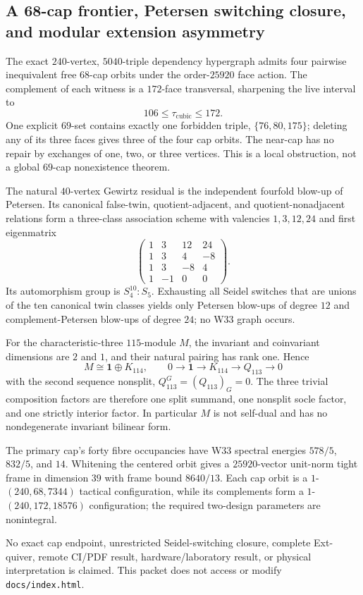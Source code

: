 \subsection{A 68-cap frontier, Petersen switching closure, and modular extension asymmetry}
\label{sec:bt3913-3928}

The exact $240$-vertex, $5040$-triple dependency hypergraph admits four pairwise inequivalent free $68$-cap orbits under the order-$25920$ face action.  The complement of each witness is a $172$-face transversal, sharpening the live interval to
\[
106\leq\tau_{\mathrm{cubic}}\leq172.
\]
One explicit $69$-set contains exactly one forbidden triple, $\{76,80,175\}$; deleting any of its three faces gives three of the four cap orbits.  The near-cap has no repair by exchanges of one, two, or three vertices.  This is a local obstruction, not a global $69$-cap nonexistence theorem.

The natural $40$-vertex Gewirtz residual is the independent fourfold blow-up of Petersen.  Its canonical false-twin, quotient-adjacent, and quotient-nonadjacent relations form a three-class association scheme with valencies $1,3,12,24$ and first eigenmatrix
\[
\begin{pmatrix}
1&3&12&24\\
1&3&4&-8\\
1&3&-8&4\\
1&-1&0&0
\end{pmatrix}.
\]
Its automorphism group is $S_4^{10}:S_5$.  Exhausting all Seidel switches that are unions of the ten canonical twin classes yields only Petersen blow-ups of degree $12$ and complement-Petersen blow-ups of degree $24$; no W33 graph occurs.

For the characteristic-three $115$-module $M$, the invariant and coinvariant dimensions are $2$ and $1$, and their natural pairing has rank one.  Hence
\[
M\cong\mathbf1\oplus K_{114},
\qquad
0\longrightarrow\mathbf1\longrightarrow K_{114}\longrightarrow Q_{113}\longrightarrow0
\]
with the second sequence nonsplit, $Q_{113}^G=(Q_{113})_G=0$.  The three trivial composition factors are therefore one split summand, one nonsplit socle factor, and one strictly interior factor.  In particular $M$ is not self-dual and has no nondegenerate invariant bilinear form.

The primary cap's forty fibre occupancies have W33 spectral energies $578/5$, $832/5$, and $14$.  Whitening the centered orbit gives a $25920$-vector unit-norm tight frame in dimension $39$ with frame bound $8640/13$.  Each cap orbit is a $1$-$(240,68,7344)$ tactical configuration, while its complements form a $1$-$(240,172,18576)$ configuration; the required two-design parameters are nonintegral.

No exact cap endpoint, unrestricted Seidel-switching closure, complete Ext-quiver, remote CI/PDF result, hardware/laboratory result, or physical interpretation is claimed.  This packet does not access or modify \texttt{docs/index.html}.
